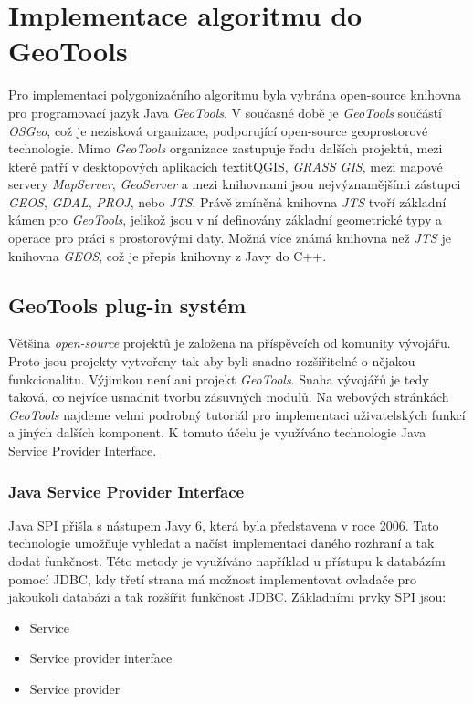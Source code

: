 \chapter{Implementace algoritmu do GeoTools}
\label{chap:implementacealgoritmudogeotools}
	Pro implementaci polygonizačního algoritmu byla vybrána open-source knihovna pro programovací jazyk Java \textit{GeoTools}. V současné době je \textit{GeoTools} součástí \textit{OSGeo}, což je nezisková organizace, podporující open-source geoprostorové technologie. Mimo \textit{GeoTools} organizace zastupuje řadu dalších projektů, mezi které patří v desktopových aplikacích textit{QGIS}, \textit{GRASS GIS}, mezi mapové servery \textit{MapServer}, \textit{GeoServer} a mezi knihovnami jsou nejvýznamějšími zástupci \textit{GEOS}, \textit{GDAL}, \textit{PROJ}, nebo \textit{JTS}. Právě zmíněná knihovna \textit{JTS} tvoří základní kámen pro \textit{GeoTools}, jelikož jsou v ní definovány základní geometrické typy a operace pro práci s prostorovými daty. Možná více známá knihovna než \textit{JTS} je knihovna \textit{GEOS}, což je přepis knihovny z Javy do C++. \cite{OSGeo} \cite{GeoTools}
	
\section{GeoTools plug-in systém}
	Většina \textit{open-source} projektů je založena na příspěvcích od komunity vývojářu. Proto jsou projekty vytvořeny tak aby byli snadno rozšiřitelné o nějakou funkcionalitu. Výjimkou není ani projekt \textit{GeoTools}. Snaha vývojářů je tedy taková, co nejvíce usnadnit tvorbu zásuvných modulů. Na webových stránkách \textit{GeoTools}\cite{GeoTools} najdeme velmi podrobný tutoriál pro implementaci uživatelských funkcí a jiných dalších komponent. K tomuto účelu je využíváno technologie Java Service Provider Interface.
	
\subsection{Java Service Provider Interface}
	Java SPI přišla s nástupem Javy 6, která byla představena v roce 2006. Tato technologie umožňuje vyhledat a načíst implementaci daného rozhraní a tak dodat funkčnost. Této metody je využíváno například u přístupu k databázím pomocí JDBC, kdy třetí strana má možnost implementovat ovladače pro jakoukoli databázi a tak rozšířit funkčnost JDBC. Základními prvky SPI jsou:
	
\begin{itemize}
	\item Service
	\item Service provider interface
	\item Service provider
\end{itemize}	
	
